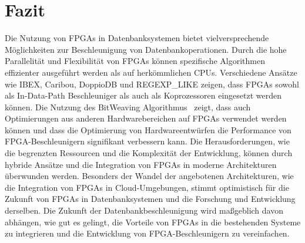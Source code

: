 \documentclass[conference]{IEEEtran}
\begin{document}
\section{Fazit} \label{sec:fazit}
Die Nutzung von FPGAs in Datenbanksystemen bietet vielversprechende Möglichkeiten zur Beschleunigung von Datenbankoperationen. Durch die hohe Parallelität
und Flexibilität von FPGAs können spezifische Algorithmen effizienter ausgeführt werden als auf herkömmlichen CPUs. Verschiedene Ansätze wie IBEX, Caribou,
DoppioDB und REGEXP\_LIKE zeigen, dass FPGAs sowohl als In-Data-Path Beschleuniger als auch als Koprozessoren eingesetzt werden können.
Die Nutzung des BitWeaving Algorithmus~\cite{lisa_column_2018} zeigt, dass auch Optimierungen aus anderen Hardwarebereichen auf FPGAs verwendet
werden können und dass die Optimierung von Hardwareentwürfen die Performance von FPGA-Beschleunigern signifikant verbessern kann.
Die Herausforderungen, wie die begrenzten Ressourcen und die Komplexität der Entwicklung, können durch hybride Ansätze und die Integration von FPGAs in moderne
Architekturen überwunden werden.
Besonders der Wandel der angebotenen Architekturen, wie die Integration von FPGAs in Cloud-Umgebungen, stimmt optimistisch für die Zukunft von FPGAs in Datenbanksystemen
und die Forschung und Entwicklung derselben.
Die Zukunft der Datenbankbeschleunigung wird maßgeblich davon abhängen, wie gut es gelingt, die Vorteile von FPGAs in die
bestehenden Systeme zu integrieren und die Entwicklung von FPGA-Beschleunigern zu vereinfachen.



\end{document}
